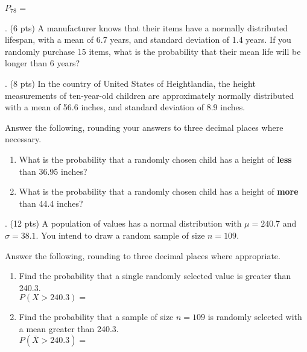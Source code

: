 \documentclass{article}
\newcommand{\newquestion}{\vspace{4mm} \noindent}
\begin{document}
\hspace{8mm} $P_{78}$ =
\vspace{35mm}

\pagebreak

\newquestion
10. (6 pts) A manufacturer knows that their items have a normally distributed lifespan, with a mean of 6.7 years, and standard deviation of 1.4 years. If you randomly purchase 15 items, what is the probability that their mean life will be longer than 6 years?
\vspace{40mm}

\newquestion
11. (8 pts) In the country of United States of Heightlandia, the height measurements of ten-year-old children are approximately normally distributed with a mean of 56.6 inches, and standard deviation of 8.9 inches.\\ \vspace{4mm}

Answer the following, rounding your answers to three decimal places where necessary.

\begin{enumerate}[label=\alph*.]
\item
  What is the probability that a randomly chosen child has a height of
  \textbf{less} than 36.95 inches?\\ \vspace{20mm}
\item
  What is the probability that a randomly chosen child has a height of
  \textbf{more} than 44.4 inches?\\ \vspace{20mm}
\end{enumerate}

\newquestion
12. (12 pts) A population of values has a normal distribution with \(\mu = 240.7\) and \(\sigma = 38.1\). You intend to draw a random sample of size \(n = 109\).

Answer the following, rounding to three decimal places where appropriate.

\begin{enumerate}[label=\alph*.]
\item
Find the probability that a single randomly selected value is greater
than 240.3.\\
$P(X > 240.3) = $
\vspace{30mm}

\item
Find the probability that a sample of size \(n = 109\) is randomly
selected with a mean greater than 240.3.\\
$P(\bar{X} > 240.3) = $
\vspace{30mm}

\end{enumerate}
\end{document}
